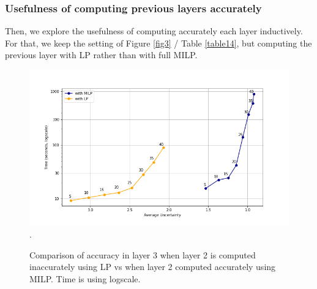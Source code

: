 %
%
%




\newpage

\subsubsection*{Usefulness of computing previous layers accurately}	


Then, we explore the usefulness of computing accurately each layer inductively.
For that, we keep the setting of Figure \ref{fig3} / Table \ref{table14}, but computing the previous layer with LP rather than with full MILP.


\begin{figure}[h!]
	\hspace*{-0.8cm}
	\includegraphics[scale=0.6]{Layer3_comparison_LP}.
	\caption{Comparison of accuracy in layer 3 when layer 2 is computed inaccurately using LP vs when layer 2 computed accurately using MILP.
	Time is using logscale.}
	\label{fig3LP}
\end{figure}









